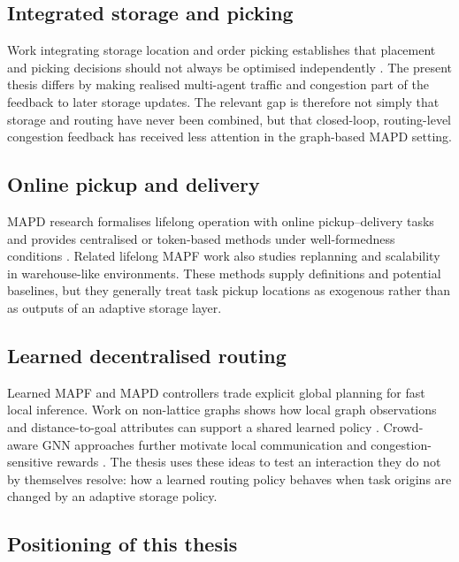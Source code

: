 \documentclass[../main.tex]{subfiles}
\begin{document}
\subsection{Integrated storage and picking}

Work integrating storage location and order picking establishes that placement
and picking decisions should not always be optimised independently
\cite{silva2020integrating}. The present thesis differs by making realised
multi-agent traffic and congestion part of the feedback to later storage
updates. The relevant gap is therefore not simply that storage and routing have
never been combined, but that closed-loop, routing-level congestion feedback
has received less attention in the graph-based MAPD setting.

\subsection{Online pickup and delivery}

MAPD research formalises lifelong operation with online pickup--delivery tasks
and provides centralised or token-based methods under well-formedness
conditions \cite{ma2017lifelong}. Related lifelong MAPF work also studies
replanning and scalability in warehouse-like environments. These methods
supply definitions and potential baselines, but they generally treat task
pickup locations as exogenous rather than as outputs of an adaptive storage
layer.

\subsection{Learned decentralised routing}

Learned MAPF and MAPD controllers trade explicit global planning for fast local
inference. Work on non-lattice graphs shows how local graph observations and
distance-to-goal attributes can support a shared learned policy
\cite{vanknippenberg2021time}. Crowd-aware GNN approaches further motivate
local communication and congestion-sensitive rewards
\cite{pham2024crowd}. The thesis uses these ideas to test an interaction they
do not by themselves resolve: how a learned routing policy behaves when task
origins are changed by an adaptive storage policy.

\subsection{Positioning of this thesis}
\end{document}
